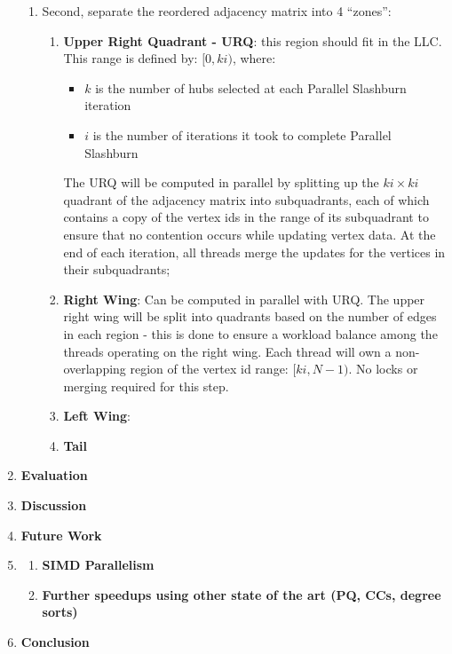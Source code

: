 \begin{enumerate}[label*=\arabic*.]
{\begin{enumerate}
\begin{itemize}
      \item In the case where the \ac{WWR} is too large, we expect that HilBurn would not perform great, so use our model to pick an appropriate Vertex-and-Edge ordering based on the input graph's graph features. 
      \end{itemize}
      \item{
        Second, separate the reordered adjacency matrix into 4 ``zones'':
        \begin{enumerate}
          \item {
            \textbf{Upper Right Quadrant - URQ}: this region should fit in the LLC. This range is defined by: $[0, ki)$, where:
            \begin{itemize}
              \item  $k$ is the number of hubs selected at each Parallel Slashburn iteration
              \item  $i$ is the number of iterations it took to complete Parallel Slashburn
            \end{itemize}
            The URQ will be computed in parallel by splitting up the $ki \times ki$ quadrant of the adjacency matrix into subquadrants, each of which contains a copy of the vertex ids in the range of its subquadrant to ensure
            that no contention occurs while updating vertex data.
            At the end of each iteration, all threads merge the updates for the vertices in their subquadrants;
          }
          \item{\textbf{Right Wing}:
          Can be computed in parallel with URQ. The upper right wing will be split into quadrants based on the number of edges in each region - this is done to ensure a workload balance among the threads operating on the right wing.
          Each thread will own a non-overlapping region of the vertex id range: $[ki, N-1)$. No locks or merging required for this step.
          }
          \item{\textbf{Left Wing}:
          
          }
          \item{\textbf{Tail}}
        \end{enumerate}
      }
      
    \end{enumerate}
  }
  \item {\textbf{Evaluation}}
  \item {\textbf{Discussion}}
  \item {\textbf{Future Work}}
  \item \begin{enumerate}[label*=\arabic*.]
    \item {\textbf{SIMD Parallelism}}
    \item {\textbf{Further speedups using other state of the art (PQ, CCs, degree sorts)}}
  \end{enumerate}
  \item {\textbf{Conclusion}}

\end{enumerate}

